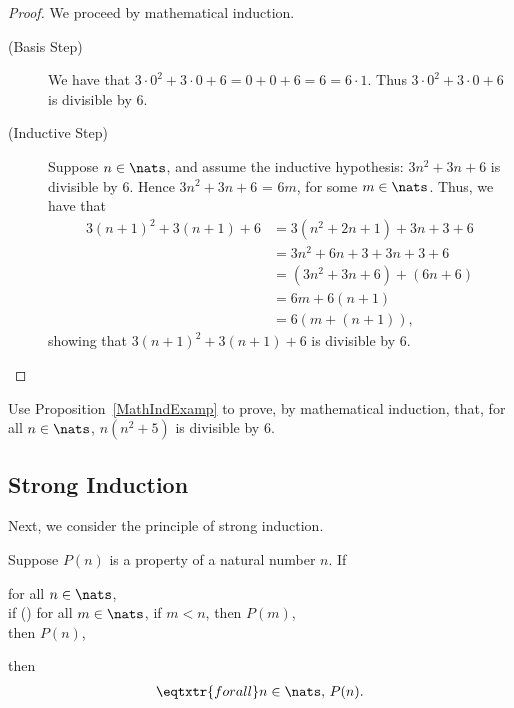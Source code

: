 \begin{proof}
We proceed by mathematical induction.

\begin{description}
\item[\quad(Basis Step)] We have that
$3\cdot 0^2 + 3\cdot 0 + 6 = 0 + 0 + 6 = 6 = 6\cdot 1$.  Thus
$3\cdot 0^2 + 3\cdot 0 + 6$ is divisible by $6$.

\item[\quad(Inductive Step)] Suppose $n\in\nats$, and assume the
inductive hypothesis: $3n^2 + 3n + 6$ is divisible by $6$.
Hence $3n^2 + 3n + 6$ = $6m$, for some $m\in\nats$.
Thus, we have that
\begin{align*}
3(n + 1)^2 + 3(n + 1) + 6
&= 3(n^2 + 2n + 1) + 3n + 3 + 6 \\
&= 3n^2 + 6n + 3 + 3n + 3 + 6 \\
&= (3n^2 + 3n + 6) + (6n + 6) \\
&= 6m + 6(n + 1) \\
&= 6(m + (n + 1)) ,
\end{align*}
showing that $3(n + 1)^2 + 3(n + 1) + 6$ is divisible by $6$.
\end{description}
\end{proof}

\begin{exercise}
Use Proposition~\ref{MathIndExamp} to prove, by mathematical induction,
that, for all $n\in\nats$, $n(n^2 + 5)$ is divisible by $6$.
\end{exercise}

\subsection{Strong Induction}

Next, we consider the principle of strong induction.

%
%
\begin{theorem}
Suppose $P(n)$ is a property of a natural number $n$.
If
\begin{ctabbing}
for all $n\in\nats$, \\
if {\rm(\dag)} for all $m\in\nats$, if $m<n$, then $P(m)$, \\
then $P(n)$,
\end{ctabbing}
then
\begin{gather*}
\eqtxtr{for all}n\in\nats,\,P(n) .
\end{gather*}
\end{theorem}

